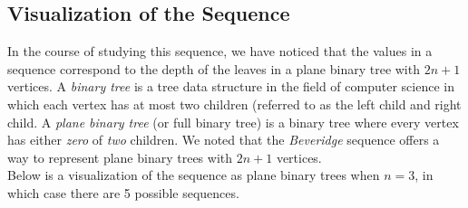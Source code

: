 \documentclass{macjourn}
\theoremstyle{definition}
\begin{document}
	\subsection{Visualization of the Sequence}
	In the course of studying this sequence, we have noticed that the values in a sequence correspond to the depth of the leaves in a plane binary tree with $2n+1$ vertices. A \emph{binary tree} is a tree data structure in the field of computer science in which each vertex has at most two children (referred to as the left child and right child. A \emph{plane binary tree} (or full binary tree) is a binary tree where every vertex has either \emph{zero} of \emph{two} children. We noted that the \emph{Beveridge} sequence offers a way to represent plane binary trees with $2n + 1$ vertices. \\
	
	Below is a visualization of the sequence as plane binary trees when $n = 3$, in which case there are 5 possible sequences.
	
\end{document}
